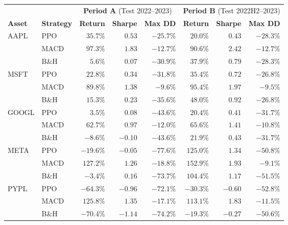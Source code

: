 \documentclass[12pt,a4paper]{article}
\begin{document}
\begin{tabular}{llrrrrrr}
\toprule
& & \multicolumn{3}{c}{\textbf{Period A} (Test 2022--2023)} &
  \multicolumn{3}{c}{\textbf{Period B} (Test 2022H2--2023)} \\
\cmidrule(lr){3-5}\cmidrule(lr){6-8}
\textbf{Asset} & \textbf{Strategy} &
  \textbf{Return} & \textbf{Sharpe} & \textbf{Max DD} &
  \textbf{Return} & \textbf{Sharpe} & \textbf{Max DD} \\
\midrule
\multirow{3}{*}{AAPL}
  & PPO   & \cellcolor{wingreen}$35.7\%$ & \cellcolor{wingreen}$0.53$ & \cellcolor{wingreen}$-25.7\%$ & $20.0\%$ & $0.43$ & $-28.3\%$ \\
  & MACD  & $97.3\%$ & $1.83$ & $-12.7\%$ & $90.6\%$ & $2.42$ & $-12.7\%$ \\
  & B\&H  & $5.6\%$ & $0.07$ & $-30.9\%$ & $37.9\%$ & $0.79$ & $-28.3\%$ \\
\midrule
\multirow{3}{*}{MSFT}
  & PPO   & \cellcolor{wingreen}$22.8\%$ & \cellcolor{wingreen}$0.34$ & \cellcolor{wingreen}$-31.8\%$ & $35.4\%$ & $0.72$ & $-26.8\%$ \\
  & MACD  & $89.8\%$ & $1.38$ & $-9.6\%$ & $95.4\%$ & $1.97$ & $-9.5\%$ \\
  & B\&H  & $15.3\%$ & $0.23$ & $-35.6\%$ & $48.0\%$ & $0.92$ & $-26.8\%$ \\
\midrule
\multirow{3}{*}{GOOGL}
  & PPO   & \cellcolor{wingreen}$3.5\%$ & \cellcolor{wingreen}$0.08$ & \cellcolor{wingreen}$-43.6\%$ & $20.4\%$ & $0.41$ & $-31.7\%$ \\
  & MACD  & $62.7\%$ & $0.97$ & $-12.0\%$ & $65.6\%$ & $1.41$ & $-10.8\%$ \\
  & B\&H  & $-8.6\%$ & $-0.10$ & $-43.6\%$ & $21.9\%$ & $0.43$ & $-31.7\%$ \\
\midrule
\multirow{3}{*}{META}
  & PPO   & $-19.6\%$ & $-0.05$ & $-77.6\%$ & \cellcolor{wingreen}$125.0\%$ & \cellcolor{wingreen}$1.34$ & \cellcolor{wingreen}$-50.8\%$ \\
  & MACD  & $127.2\%$ & $1.26$ & $-18.8\%$ & $152.9\%$ & $1.93$ & $-9.1\%$ \\
  & B\&H  & $-3.4\%$ & $0.16$ & $-73.7\%$ & $104.4\%$ & $1.17$ & $-51.5\%$ \\
\midrule
\multirow{3}{*}{PYPL}
  & PPO   & \cellcolor{wingreen}$-64.3\%$ & \cellcolor{wingreen}$-0.96$ & \cellcolor{wingreen}$-72.1\%$ & $-30.3\%$ & $-0.60$ & $-52.8\%$ \\
  & MACD  & $125.8\%$ & $1.35$ & $-17.1\%$ & $113.1\%$ & $1.83$ & $-11.5\%$ \\
  & B\&H  & $-70.4\%$ & $-1.14$ & $-74.2\%$ & $-19.3\%$ & $-0.27$ & $-50.6\%$ \\

\end{tabular}
\end{document}
